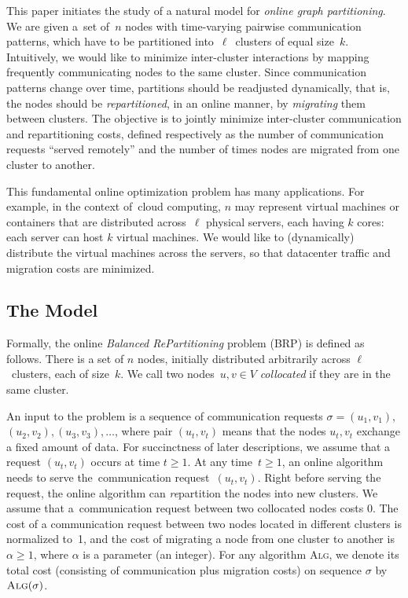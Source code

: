\documentclass{siamart190516}
\newcommand{\ALG}{\textsc{Alg}\xspace}
\begin{document}
This paper initiates the study of a natural model for \emph{online graph
partitioning}. We are given a~set of~$n$ nodes with time-varying pairwise
communication patterns, which have to be partitioned into~$\ell$~clusters of
equal size~$k$. Intuitively, we would like to minimize inter-cluster
interactions by mapping frequently communicating nodes to the same cluster.
Since communication patterns change over time, partitions should be
readjusted dynamically, that is, the nodes should be \emph{repartitioned}, in
an online manner, by \emph{migrating} them between clusters. The objective is
to jointly minimize inter-cluster communication and repartitioning costs,
defined respectively as the number of communication requests ``served
remotely'' and the number of times nodes are migrated from one cluster to
another.

This fundamental online optimization problem has many applications. For
example, in the context of~cloud computing, $n$ may represent virtual machines
or containers that are distributed across~$\ell$ physical servers, each having
$k$ cores: each server can host $k$ virtual machines. We would like to
(dynamically) distribute the virtual machines across the servers, so that
datacenter traffic and migration costs are minimized.


\subsection{The Model}

Formally, the online \emph{Balanced RePartitioning} problem (BRP) is defined as
follows. There is a set of $n$ nodes, initially distributed arbitrarily
across $\ell$~clusters, each of size~$k$. We call two nodes~$u,v\in V$
\emph{collocated} if they are in the same cluster.

An input to the problem is a sequence of communication requests $\sigma =
(u_1,v_1),$ $(u_2,v_2), (u_3,v_3), \ldots$, where pair $(u_t,v_t)$ means that
the nodes $u_t,v_t$ exchange a fixed amount of data. For succinctness of later descriptions,
we assume that a request $(u_t,v_t)$ occurs at time $t \geq 1$. At any time~$t
\geq 1$, an online algorithm needs to serve the~communication
request~$(u_t,v_t)$. Right before serving the request, the online algorithm
can \emph{re}partition the nodes into new clusters. We assume that
a~communication request between two collocated nodes costs 0. The cost of a
communication request between two nodes located in different clusters is
normalized to~1, and the cost of migrating a node from one cluster to another
is~$\alpha \geq 1$, where $\alpha$ is a parameter (an integer). For any
algorithm \ALG, we denote its total cost (consisting of communication plus
migration costs) on sequence $\sigma$ by $\ALG(\sigma)$.
\end{document}
